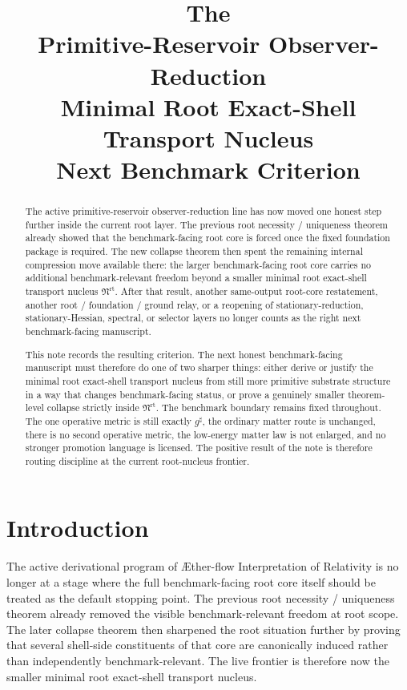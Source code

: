 \documentclass[11pt]{article}
\title{\textbf{The \TheoryName{}}\\[0.4em]
\large Primitive-Reservoir Observer-Reduction\\
\large Minimal Root Exact-Shell Transport Nucleus\\
\large Next Benchmark Criterion}
\author{}
\date{}
\newcommand{\Aflow}{\AE{}ther-flow}
\newcommand{\TheoryName}{\Aflow{} Interpretation of Relativity}
\newcommand{\CompletedMetric}{g^{\sharp}}
\newcommand{\RootNucleus}{\mathfrak N^{\mathrm{rt}}}
\begin{document}
\maketitle

\begin{abstract}
The active primitive-reservoir observer-reduction line has now moved one honest step further inside the current root layer. The previous root necessity / uniqueness theorem already showed that the benchmark-facing root core is forced once the fixed foundation package is required. The new collapse theorem then spent the remaining internal compression move available there: the larger benchmark-facing root core carries no additional benchmark-relevant freedom beyond a smaller minimal root exact-shell transport nucleus \(\RootNucleus\). After that result, another same-output root-core restatement, another root / foundation / ground relay, or a reopening of stationary-reduction, stationary-Hessian, spectral, or selector layers no longer counts as the right next benchmark-facing manuscript.

This note records the resulting criterion. The next honest benchmark-facing manuscript must therefore do one of two sharper things: either derive or justify the minimal root exact-shell transport nucleus from still more primitive substrate structure in a way that changes benchmark-facing status, or prove a genuinely smaller theorem-level collapse strictly inside \(\RootNucleus\). The benchmark boundary remains fixed throughout. The one operative metric is still exactly \(\CompletedMetric\), the ordinary matter route is unchanged, there is no second operative metric, the low-energy matter law is not enlarged, and no stronger promotion language is licensed. The positive result of the note is therefore routing discipline at the current root-nucleus frontier.
\end{abstract}

\section{Introduction}

The active derivational program of \TheoryName{} is no longer at a stage where the full benchmark-facing root core itself should be treated as the default stopping point. The previous root necessity / uniqueness theorem already removed the visible benchmark-relevant freedom at root scope. The later collapse theorem then sharpened the root situation further by proving that several shell-side constituents of that core are canonically induced rather than independently benchmark-relevant. The live frontier is therefore now the smaller minimal root exact-shell transport nucleus.
\end{document}
